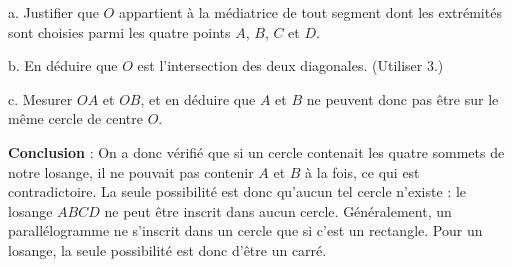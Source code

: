 \documentclass[12 pt]{article}
\theoremstyle{plain}
\newcounter{n}
\numberwithin{n}{section}
\begin{document}
a. Justifier que $O$ appartient à la médiatrice de tout segment dont les extrémités sont choisies parmi les quatre
points $A$, $B$, $C$ et $D$. 

b. En déduire que $O$ est l'intersection des deux diagonales. (Utiliser 3.)

c. Mesurer $OA$ et $OB$, et en déduire que $A$ et $B$ ne peuvent donc pas être sur le même cercle de centre $O$. 

\textbf{Conclusion} : On a donc vérifié que si un cercle contenait les quatre sommets de notre losange, il ne pouvait pas contenir $A$ et $B$ à la fois, ce qui est contradictoire. La seule possibilité est donc qu'aucun tel cercle n'existe : le losange $ABCD$ ne peut être inscrit dans aucun cercle. Généralement, un parallélogramme ne s'inscrit dans un cercle que si c'est un rectangle. Pour un losange, la seule possibilité est donc d'être un carré. 


	
\end{document}
